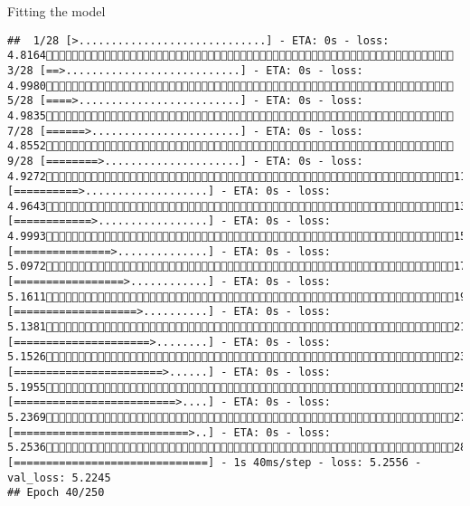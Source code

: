 \documentclass[
  ignorenonframetext,
]{beamer}
\begin{document}
\begin{frame}[fragile]{Fitting the model}
\begin{verbatim}
##  1/28 [>.............................] - ETA: 0s - loss: 4.8164 3/28 [==>...........................] - ETA: 0s - loss: 4.9980 5/28 [====>.........................] - ETA: 0s - loss: 4.9835 7/28 [======>.......................] - ETA: 0s - loss: 4.8552 9/28 [========>.....................] - ETA: 0s - loss: 4.927211/28 [==========>...................] - ETA: 0s - loss: 4.964313/28 [============>.................] - ETA: 0s - loss: 4.999315/28 [===============>..............] - ETA: 0s - loss: 5.097217/28 [=================>............] - ETA: 0s - loss: 5.161119/28 [===================>..........] - ETA: 0s - loss: 5.138121/28 [=====================>........] - ETA: 0s - loss: 5.152623/28 [=======================>......] - ETA: 0s - loss: 5.195525/28 [=========================>....] - ETA: 0s - loss: 5.236927/28 [===========================>..] - ETA: 0s - loss: 5.253628/28 [==============================] - 1s 40ms/step - loss: 5.2556 - val_loss: 5.2245
## Epoch 40/250

\end{verbatim}
\end{frame}
\end{document}
